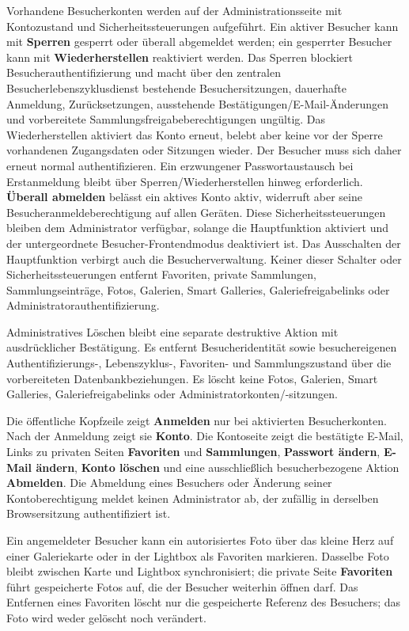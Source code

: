 \documentclass[11pt,a4paper]{article}
\newcommand{\ui}[1]{\textbf{#1}}
\begin{document}
Vorhandene Besucherkonten werden auf der Administrationsseite mit Kontozustand
und Sicherheitssteuerungen aufgeführt. Ein aktiver Besucher kann mit
\ui{Sperren} gesperrt oder überall abgemeldet werden; ein gesperrter Besucher
kann mit \ui{Wiederherstellen} reaktiviert werden. Das Sperren blockiert
Besucherauthentifizierung und macht über den zentralen
Besucherlebenszyklusdienst bestehende Besuchersitzungen, dauerhafte Anmeldung,
Zurücksetzungen, ausstehende Bestätigungen/E-Mail-Änderungen und vorbereitete
Sammlungsfreigabeberechtigungen ungültig. Das Wiederherstellen aktiviert das
Konto erneut, belebt aber keine vor der Sperre vorhandenen Zugangsdaten oder
Sitzungen wieder. Der Besucher muss sich daher erneut normal authentifizieren.
Ein erzwungener Passwortaustausch bei Erstanmeldung bleibt über
Sperren/Wiederherstellen hinweg erforderlich. \ui{Überall abmelden} belässt ein
aktives Konto aktiv, widerruft aber seine Besucheranmeldeberechtigung auf allen
Geräten. Diese Sicherheitssteuerungen bleiben dem Administrator verfügbar,
solange die Hauptfunktion aktiviert und der untergeordnete
Besucher-Frontendmodus deaktiviert ist. Das Ausschalten der Hauptfunktion
verbirgt auch die Besucherverwaltung. Keiner dieser Schalter oder
Sicherheitssteuerungen entfernt Favoriten, private Sammlungen,
Sammlungseinträge, Fotos, Galerien, Smart Galleries, Galeriefreigabelinks oder
Administratorauthentifizierung.

Administratives Löschen bleibt eine separate destruktive Aktion mit
ausdrücklicher Bestätigung. Es entfernt Besucheridentität sowie besuchereigenen
Authentifizierungs-, Lebenszyklus-, Favoriten- und Sammlungszustand über die
vorbereiteten Datenbankbeziehungen. Es löscht keine Fotos, Galerien, Smart
Galleries, Galeriefreigabelinks oder Administratorkonten/-sitzungen.

Die öffentliche Kopfzeile zeigt \ui{Anmelden} nur bei aktivierten
Besucherkonten. Nach der Anmeldung zeigt sie \ui{Konto}. Die Kontoseite zeigt
die bestätigte E-Mail, Links zu privaten Seiten \ui{Favoriten} und
\ui{Sammlungen}, \ui{Passwort ändern}, \ui{E-Mail ändern}, \ui{Konto löschen}
und eine ausschließlich besucherbezogene Aktion \ui{Abmelden}. Die Abmeldung
eines Besuchers oder Änderung seiner Kontoberechtigung meldet keinen
Administrator ab, der zufällig in derselben Browsersitzung authentifiziert ist.

Ein angemeldeter Besucher kann ein autorisiertes Foto über das kleine Herz auf
einer Galeriekarte oder in der Lightbox als Favoriten markieren. Dasselbe Foto
bleibt zwischen Karte und Lightbox synchronisiert; die private Seite
\ui{Favoriten} führt gespeicherte Fotos auf, die der Besucher weiterhin öffnen
darf. Das Entfernen eines Favoriten löscht nur die gespeicherte Referenz des
Besuchers; das Foto wird weder gelöscht noch verändert.
\end{document}
